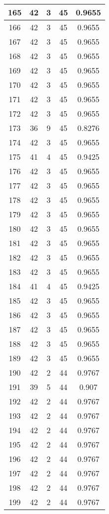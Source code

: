 \documentclass[letterpaper, 12pt]{article}
\begin{document}
\begin{longtable}{|c|c|c|c|c|}
\hline
165 & 42 & 3 & 45 & 0.9655 \\
\hline
166 & 42 & 3 & 45 & 0.9655 \\
\hline
167 & 42 & 3 & 45 & 0.9655 \\
\hline
168 & 42 & 3 & 45 & 0.9655 \\
\hline
169 & 42 & 3 & 45 & 0.9655 \\
\hline
170 & 42 & 3 & 45 & 0.9655 \\
\hline
171 & 42 & 3 & 45 & 0.9655 \\
\hline
172 & 42 & 3 & 45 & 0.9655 \\
\hline
173 & 36 & 9 & 45 & 0.8276 \\
\hline
174 & 42 & 3 & 45 & 0.9655 \\
\hline
175 & 41 & 4 & 45 & 0.9425 \\
\hline
176 & 42 & 3 & 45 & 0.9655 \\
\hline
177 & 42 & 3 & 45 & 0.9655 \\
\hline
178 & 42 & 3 & 45 & 0.9655 \\
\hline
179 & 42 & 3 & 45 & 0.9655 \\
\hline
180 & 42 & 3 & 45 & 0.9655 \\
\hline
181 & 42 & 3 & 45 & 0.9655 \\
\hline
182 & 42 & 3 & 45 & 0.9655 \\
\hline
183 & 42 & 3 & 45 & 0.9655 \\
\hline
184 & 41 & 4 & 45 & 0.9425 \\
\hline
185 & 42 & 3 & 45 & 0.9655 \\
\hline
186 & 42 & 3 & 45 & 0.9655 \\
\hline
187 & 42 & 3 & 45 & 0.9655 \\
\hline
188 & 42 & 3 & 45 & 0.9655 \\
\hline
189 & 42 & 3 & 45 & 0.9655 \\
\hline
190 & 42 & 2 & 44 & 0.9767 \\
\hline
191 & 39 & 5 & 44 & 0.907 \\
\hline
192 & 42 & 2 & 44 & 0.9767 \\
\hline
193 & 42 & 2 & 44 & 0.9767 \\
\hline
194 & 42 & 2 & 44 & 0.9767 \\
\hline
195 & 42 & 2 & 44 & 0.9767 \\
\hline
196 & 42 & 2 & 44 & 0.9767 \\
\hline
197 & 42 & 2 & 44 & 0.9767 \\
\hline
198 & 42 & 2 & 44 & 0.9767 \\
\hline
199 & 42 & 2 & 44 & 0.9767 \\
\hline
\end{longtable}
\end{document}
